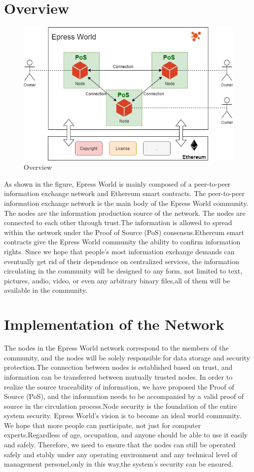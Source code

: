\documentclass{article}
\begin{document}
\section{Overview}
    \begin{figure}[H]
        \centering
        \includegraphics[width=\textwidth]{figures-overview.png}
        \caption{Overview}
    \end{figure}
    As shown in the figure, Epress World is mainly composed of a peer-to-peer information exchange network and Ethereum smart contracts. The peer-to-peer information exchange network is the main body of the Epress World community. The nodes are the information production source of the network. The nodes are connected to each other through trust.The information is allowed to spread within the network under the Proof of Source (PoS) consensus.Ethereum smart contracts give the Epress World community the ability to confirm information rights. Since we hope that people's most information exchange demands can eventually get rid of their dependence on centralized services, the information circulating in the community will be designed to any form, not limited to text, pictures, audio, video, or even any arbitrary  binary files,all of them  will be available in the community.
\section{Implementation of the Network}
    The nodes in the Epress World network correspond to the members of the community, and the nodes will be solely responsible for data storage and security protection.The connection between nodes is established based on trust, and information can be transferred between mutually trusted nodes. In order to realize the source traceability of information, we have proposed the Proof of Source (PoS), and the information needs to be accompanied by a valid proof of source in the circulation process.Node security is the foundation of the entire system security. Epress World's vision is to become an ideal world community. We hope that more people can participate, not just for computer experts.Regardless of age, occupation, and anyone should be able to use it easily and safely. Therefore, we need to ensure that the nodes can still be operated safely and stably under any operating environment and any technical level of management personel,only in this way,the system's security can be ensured.
\end{document}

